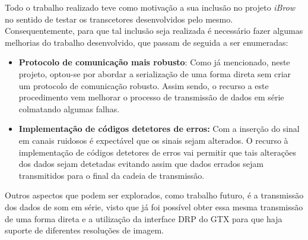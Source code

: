 Todo o trabalho realizado teve como motivação a sua inclusão no projeto \textit{iBrow} no sentido de testar os transcetores desenvolvidos pelo mesmo. Consequentemente, para que tal inclusão seja realizada é necessário fazer algumas melhorias do trabalho desenvolvido, que passam de seguida a ser enumeradas:
\begin{itemize}
	\item \textbf{Protocolo de comunicação mais robusto}: Como já mencionado, neste projeto, optou-se por abordar a serialização de uma forma direta sem criar um protocolo de comunicação robusto. Assim sendo, o recurso a este procedimento vem melhorar o processo de transmissão de dados em série colmatando algumas falhas.
	
	\item \textbf{Implementação de códigos detetores de erros:} Com a inserção do sinal em canais ruidosos é expectável que os sinais sejam alterados. O recurso à implementação de códigos detetores de erros vai permitir que tais alterações dos dados sejam detetadas evitando assim que dados errados sejam transmitidos para o final da cadeia de transmissão.
\end{itemize}

Outros aspectos que podem ser explorados, como trabalho futuro, é a transmissão dos dados de som em série, visto que já foi possível obter essa mesma transmissão de uma forma direta e a utilização da interface DRP do GTX para que haja suporte de diferentes resoluções de imagem.

%
%
%

